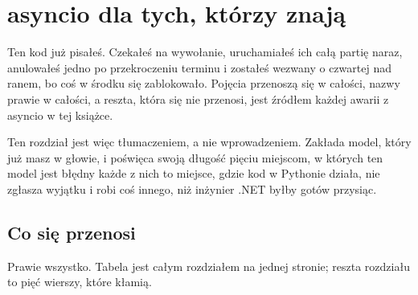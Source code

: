 
\chapter{asyncio dla tych, którzy znają \texorpdfstring{}{Task}}
\label{ch:asyncio}

\noindent
Ten kod już pisałeś. Czekałeś na wywołanie, uruchamiałeś ich całą partię
naraz, anulowałeś jedno po przekroczeniu terminu i zostałeś wezwany o
czwartej nad ranem, bo coś w środku się zablokowało. Pojęcia przenoszą się
w całości, nazwy prawie w całości, a reszta, która się nie przenosi, jest
źródłem każdej awarii z asyncio w tej książce.

Ten rozdział jest więc tłumaczeniem, a nie wprowadzeniem. Zakłada model,
który już masz w głowie, i poświęca swoją długość pięciu miejscom, w
których ten model jest błędny \dash{} każde z nich to miejsce, gdzie kod w
Pythonie działa, nie zgłasza wyjątku i robi coś innego, niż inżynier .NET
byłby gotów przysiąc.

\section{Co się przenosi}
\label{sec:asyncio-map}

Prawie wszystko. Tabela jest całym rozdziałem na jednej stronie; reszta
rozdziału to pięć wierszy, które kłamią.

